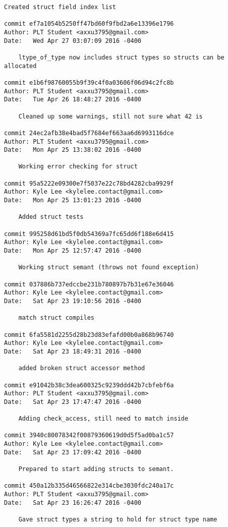 \begin{lstlisting}[backgroundcolor=\color{white}]
    Created struct field index list

commit ef7a1054b5250ff47bd60f9fbd2a6e13396e1796
Author: PLT Student <axxu3795@gmail.com>
Date:   Wed Apr 27 03:07:09 2016 -0400

    ltype_of_type now includes struct types so structs can be allocated

commit e1b6f98760055b9f39c4f0a03606f06d94c2fc8b
Author: PLT Student <axxu3795@gmail.com>
Date:   Tue Apr 26 18:48:27 2016 -0400

    Cleaned up some warnings, still not sure what 42 is

commit 24ec2afb38e4bad5f7684ef663aa6d6993116dce
Author: PLT Student <axxu3795@gmail.com>
Date:   Mon Apr 25 13:38:02 2016 -0400

    Working error checking for struct

commit 95a5222e09300e7f5037e22c78bd4282cba9929f
Author: Kyle Lee <kylelee.contact@gmail.com>
Date:   Mon Apr 25 13:01:23 2016 -0400

    Added struct tests

commit 995258d61bd5f0db54369a7fc65dd6f188e6d415
Author: Kyle Lee <kylelee.contact@gmail.com>
Date:   Mon Apr 25 12:57:47 2016 -0400

    Working struct semant (throws not found exception)

commit 037886b737edccbe231b780897b7b31e67e36046
Author: Kyle Lee <kylelee.contact@gmail.com>
Date:   Sat Apr 23 19:10:56 2016 -0400

    match struct compiles

commit 6fa5581d2255d28b23d83efafd00b0a868b96740
Author: Kyle Lee <kylelee.contact@gmail.com>
Date:   Sat Apr 23 18:49:31 2016 -0400

    added broken struct accessor method

commit e91042b38c3dea600325c9239ddd42b7cbfebf6a
Author: PLT Student <axxu3795@gmail.com>
Date:   Sat Apr 23 17:47:47 2016 -0400

    Adding check_access, still need to match inside

commit 3940c80078342f00879360619d0d5f5ad0ba1c57
Author: Kyle Lee <kylelee.contact@gmail.com>
Date:   Sat Apr 23 17:09:42 2016 -0400

    Prepared to start adding structs to semant.

commit 450a12b335d46566822e314cbe3030fdc240a17c
Author: PLT Student <axxu3795@gmail.com>
Date:   Sat Apr 23 16:26:47 2016 -0400

    Gave struct types a string to hold for struct type name


\end{lstlisting}
